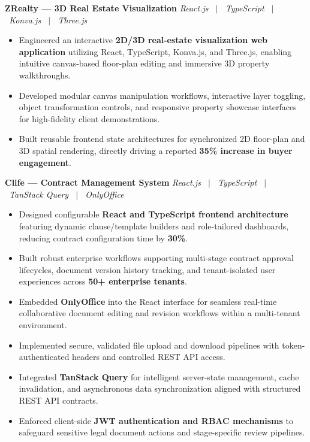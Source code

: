 \documentclass[letterpaper,10pt]{article}
\newcommand{\resumeProject}[2]{%
  \vspace{2pt}%
  \textbf{#1} \hfill \textit{#2}\\[-6pt]
}
\begin{document}
\resumeProject
  {ZRealty --- 3D Real Estate Visualization}{React.js \ $|$ \ TypeScript \ $|$ \ Konva.js \ $|$ \ Three.js}
\begin{itemize}
  \item Engineered an interactive \textbf{2D/3D real-estate visualization web application} utilizing React, TypeScript, Konva.js, and Three.js, enabling intuitive canvas-based floor-plan editing and immersive 3D property walkthroughs.
  \item Developed modular canvas manipulation workflows, interactive layer toggling, object transformation controls, and responsive property showcase interfaces for high-fidelity client demonstrations.
  \item Built reusable frontend state architectures for synchronized 2D floor-plan and 3D spatial rendering, directly driving a reported \textbf{35\% increase in buyer engagement}.
\end{itemize}
\vspace{0.2cm}
\resumeProject
  {Clife --- Contract Management System}{React.js \ $|$ \ TypeScript \ $|$ \ TanStack Query \ $|$ \ OnlyOffice}
\begin{itemize}
  \item Designed configurable \textbf{React and TypeScript frontend architecture} featuring dynamic clause/template builders and role-tailored dashboards, reducing contract configuration time by \textbf{30\%}.
  \item Built robust enterprise workflows supporting multi-stage contract approval lifecycles, document version history tracking, and tenant-isolated user experiences across \textbf{50+ enterprise tenants}.
  \item Embedded \textbf{OnlyOffice} into the React interface for seamless real-time collaborative document editing and revision workflows within a multi-tenant environment.
  \item Implemented secure, validated file upload and download pipelines with token-authenticated headers and controlled REST API access.
  \item Integrated \textbf{TanStack Query} for intelligent server-state management, cache invalidation, and asynchronous data synchronization aligned with structured REST API contracts.
  \item Enforced client-side \textbf{JWT authentication and RBAC mechanisms} to safeguard sensitive legal document actions and stage-specific review pipelines.
\end{itemize}
\vspace{0.2cm}
\end{document}
